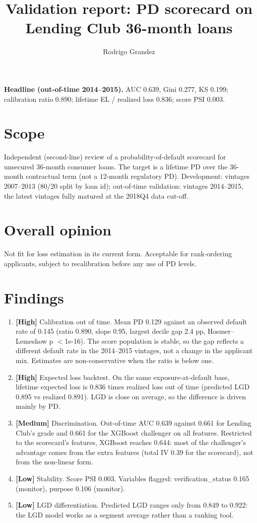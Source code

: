 \documentclass[11pt,a4paper]{article}
\title{Validation report: PD scorecard on Lending Club 36-month loans}\author{Rodrigo Grandez}\date{}
\begin{document}
\maketitle
\noindent\textbf{Headline (out-of-time 2014--2015).} AUC 0.639, Gini 0.277,
KS 0.199; calibration ratio 0.890; lifetime EL / realized loss
0.836; score PSI 0.003.
\section*{Scope}
Independent (second-line) review of a probability-of-default scorecard for unsecured 36-month consumer loans.
The target is a lifetime PD over the 36-month contractual term (not a 12-month regulatory PD). Development: vintages 2007--2013 (80/20 split by loan id); out-of-time
validation: vintages 2014--2015, the latest vintages fully matured at the 2018Q4 data cut-off.

\section*{Overall opinion}
Not fit for loss estimation in its current form. Acceptable for rank-ordering applicants, subject to recalibration before any use of PD levels.

\section*{Findings}
\begin{enumerate}
\item \textbf{[High]} Calibration out of time. Mean PD 0.129 against an observed default rate of 0.145 (ratio 0.890, slope 0.95, largest decile gap 2.4 pp, Hosmer--Lemeshow p $<$1e-16). The score population is stable, so the gap reflects a different default rate in the 2014--2015 vintages, not a change in the applicant mix. Estimates are non-conservative when the ratio is below one.
\item \textbf{[High]} Expected loss backtest. On the same exposure-at-default base, lifetime expected loss is 0.836 times realized loss out of time (predicted LGD 0.895 vs realized 0.891). LGD is close on average, so the difference is driven mainly by PD.
\item \textbf{[Medium]} Discrimination. Out-of-time AUC 0.639 against 0.661 for Lending Club's grade and 0.661 for the XGBoost challenger on all features. Restricted to the scorecard's features, XGBoost reaches 0.644: most of the challenger's advantage comes from the extra features (total IV 0.39 for the scorecard), not from the non-linear form.
\item \textbf{[Low]} Stability. Score PSI 0.003. Variables flagged: verification\_status 0.165 (monitor), purpose 0.106 (monitor).
\item \textbf{[Low]} LGD differentiation. Predicted LGD ranges only from 0.849 to 0.922: the LGD model works as a segment average rather than a ranking tool.
\end{enumerate}
\end{document}
